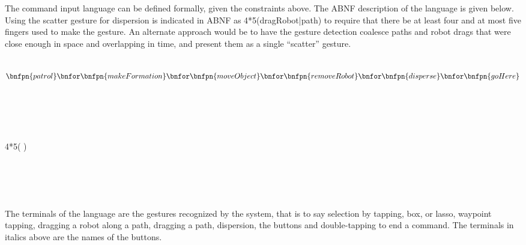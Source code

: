 The command input language can be defined formally, given the constraints above. The ABNF description of the language is given below. Using the scatter gesture for dispersion is indicated in ABNF as 4*5(dragRobot|path) to require that there be at least four and at most five fingers used to make the gesture. 
An alternate approach would be to have the gesture detection coalesce paths and robot drags that were close enough in space and overlapping in time, and present them as a single ``scatter'' gesture. 

\newenvironment{bnfsplit}[1][0.7\textwidth]
{\minipage[t]{#1}$}
{$\endminipage}

\begin{bnf}
	{ }\\
	{
		\begin{bnfsplit}
		\bnfpn{patrol} \bnfor \bnfpn{makeFormation} \bnfor \bnfpn{moveObject}\\
		\bnfor \bnfpn{removeRobot} \bnfor \bnfpn{disperse} \bnfor \bnfpn{goHere} 
		\vspace{2mm}
		\end{bnfsplit}
	}\\
	{}\\
	{}\\
	{}\\
	{}\\
	{}\\
	{4*5( \bnfor {})}\\
	{ \bnfor {}}\\
	{ \bnfor {}}\\
	{}\\
	{ \bnfor {} \bnfor {}}\\
	{ \bnfor {}}
\end{bnf}

The terminals of the language are the gestures recognized by the system, that is to say selection by tapping, box, or lasso, waypoint tapping, dragging a robot along a path, dragging a path, dispersion, the buttons and double-tapping to end a command. 
The terminals in italics above are the names of the buttons. 
